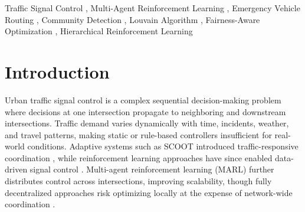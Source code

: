 \documentclass[3p,times]{elsarticle}
\theoremstyle{plain}
\theoremstyle{definition}
\begin{document}
\begin{frontmatter}
\begin{abstract}
A central feature of the proposed framework is the explicit treatment
of fairness as a traffic-control objective. Conventional
evaluation based only on average delay, average travel time, or
throughput can hide excessive delays experienced by a smaller group of
vehicles. The proposed framework therefore incorporates
vehicle-level waiting-time distribution, maximum waiting time, tail
waiting time, and Jain's fairness index into optimization and
evaluation. A multi-objective reward function jointly considers traffic
efficiency, fairness, and emergency responsiveness.

The framework also treats region construction as part of the
research problem rather than merely a preprocessing step. DBSCAN,
Louvain, Leiden, and hybrid region construction methods are
investigated to determine how the choice of regional abstraction
affects downstream traffic-control performance.

\end{abstract}

\begin{keyword}
Traffic Signal Control \sep
Multi-Agent Reinforcement Learning \sep
Emergency Vehicle Routing \sep
Community Detection \sep
Louvain Algorithm \sep
Fairness-Aware Optimization \sep
Hierarchical Reinforcement Learning
\end{keyword}

\end{frontmatter}


\section{Introduction}\label{sec1}

Urban traffic signal control is a complex sequential decision-making
problem where decisions at one intersection propagate to neighboring
and downstream intersections. Traffic demand varies dynamically with
time, incidents, weather, and travel patterns, making static or
rule-based controllers insufficient for real-world conditions.
Adaptive systems such as SCOOT introduced traffic-responsive
coordination \cite{scoot}, while reinforcement learning approaches
have since enabled data-driven signal control
\cite{intellight}. Multi-agent reinforcement learning (MARL) further
distributes control across intersections, improving scalability,
though fully decentralized approaches risk optimizing locally at the
expense of network-wide coordination \cite{thousandlights,ma2c}.
\end{document}

